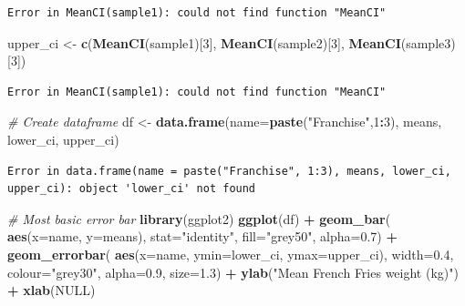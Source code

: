 \documentclass[]{book}
\newenvironment{Shaded}{\begin{snugshade}}{\end{snugshade}}
\newcommand{\CommentTok}[1]{\textcolor[rgb]{0.56,0.35,0.01}{\textit{#1}}}
\newcommand{\DataTypeTok}[1]{\textcolor[rgb]{0.13,0.29,0.53}{#1}}
\newcommand{\DecValTok}[1]{\textcolor[rgb]{0.00,0.00,0.81}{#1}}
\newcommand{\FloatTok}[1]{\textcolor[rgb]{0.00,0.00,0.81}{#1}}
\newcommand{\KeywordTok}[1]{\textcolor[rgb]{0.13,0.29,0.53}{\textbf{#1}}}
\newcommand{\NormalTok}[1]{#1}
\newcommand{\OperatorTok}[1]{\textcolor[rgb]{0.81,0.36,0.00}{\textbf{#1}}}
\newcommand{\OtherTok}[1]{\textcolor[rgb]{0.56,0.35,0.01}{#1}}
\newcommand{\StringTok}[1]{\textcolor[rgb]{0.31,0.60,0.02}{#1}}
\begin{document}
\begin{verbatim}
Error in MeanCI(sample1): could not find function "MeanCI"
\end{verbatim}

\begin{Shaded}
\begin{Highlighting}[]
\NormalTok{upper_ci <-}\StringTok{ }\KeywordTok{c}\NormalTok{(}\KeywordTok{MeanCI}\NormalTok{(sample1)[}\DecValTok{3}\NormalTok{],}
              \KeywordTok{MeanCI}\NormalTok{(sample2)[}\DecValTok{3}\NormalTok{],}
              \KeywordTok{MeanCI}\NormalTok{(sample3)[}\DecValTok{3}\NormalTok{])}
\end{Highlighting}
\end{Shaded}

\begin{verbatim}
Error in MeanCI(sample1): could not find function "MeanCI"
\end{verbatim}

\begin{Shaded}
\begin{Highlighting}[]
\CommentTok{# Create dataframe}
\NormalTok{df <-}\StringTok{ }\KeywordTok{data.frame}\NormalTok{(}\DataTypeTok{name=}\KeywordTok{paste}\NormalTok{(}\StringTok{"Franchise"}\NormalTok{,}\DecValTok{1}\OperatorTok{:}\DecValTok{3}\NormalTok{),}
\NormalTok{                   means,}
\NormalTok{                   lower_ci,}
\NormalTok{                   upper_ci)}
\end{Highlighting}
\end{Shaded}

\begin{verbatim}
Error in data.frame(name = paste("Franchise", 1:3), means, lower_ci, upper_ci): object 'lower_ci' not found
\end{verbatim}

\begin{Shaded}
\begin{Highlighting}[]
\CommentTok{# Most basic error bar}
\KeywordTok{library}\NormalTok{(ggplot2)}
\KeywordTok{ggplot}\NormalTok{(df) }\OperatorTok{+}
\StringTok{    }\KeywordTok{geom_bar}\NormalTok{( }\KeywordTok{aes}\NormalTok{(}\DataTypeTok{x=}\NormalTok{name, }\DataTypeTok{y=}\NormalTok{means), }\DataTypeTok{stat=}\StringTok{"identity"}\NormalTok{, }\DataTypeTok{fill=}\StringTok{"grey50"}\NormalTok{, }\DataTypeTok{alpha=}\FloatTok{0.7}\NormalTok{) }\OperatorTok{+}
\StringTok{    }\KeywordTok{geom_errorbar}\NormalTok{( }\KeywordTok{aes}\NormalTok{(}\DataTypeTok{x=}\NormalTok{name, }\DataTypeTok{ymin=}\NormalTok{lower_ci, }\DataTypeTok{ymax=}\NormalTok{upper_ci), }
                   \DataTypeTok{width=}\FloatTok{0.4}\NormalTok{, }\DataTypeTok{colour=}\StringTok{"grey30"}\NormalTok{, }\DataTypeTok{alpha=}\FloatTok{0.9}\NormalTok{, }\DataTypeTok{size=}\FloatTok{1.3}\NormalTok{) }\OperatorTok{+}\StringTok{ }
\StringTok{    }\KeywordTok{ylab}\NormalTok{(}\StringTok{"Mean French Fries weight (kg)"}\NormalTok{) }\OperatorTok{+}
\StringTok{    }\KeywordTok{xlab}\NormalTok{(}\OtherTok{NULL}\NormalTok{)}
\end{Highlighting}
\end{Shaded}
\end{document}
